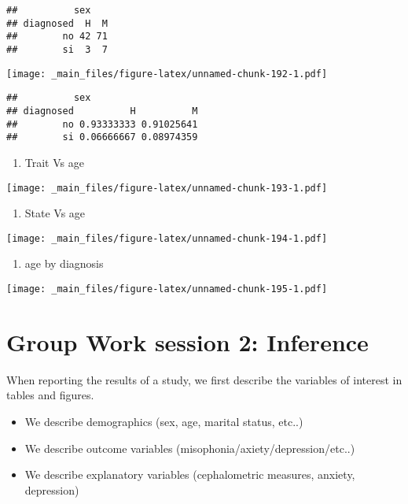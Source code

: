 \documentclass[
]{book}
\providecommand{\tightlist}{%
  \setlength{\itemsep}{0pt}\setlength{\parskip}{0pt}}
\begin{document}
\begin{verbatim}
##          sex
## diagnosed  H  M
##        no 42 71
##        si  3  7
\end{verbatim}

\texttt{[image: \_main\_files/figure-latex/unnamed-chunk-192-1.pdf]}

\begin{verbatim}
##          sex
## diagnosed          H          M
##        no 0.93333333 0.91025641
##        si 0.06666667 0.08974359
\end{verbatim}

\begin{enumerate}
\def\labelenumi{\alph{enumi}.}
\setcounter{enumi}{7}
\tightlist
\item
  Trait Vs age
\end{enumerate}

\texttt{[image: \_main\_files/figure-latex/unnamed-chunk-193-1.pdf]}

\begin{enumerate}
\def\labelenumi{\roman{enumi}.}
\tightlist
\item
  State Vs age
\end{enumerate}

\texttt{[image: \_main\_files/figure-latex/unnamed-chunk-194-1.pdf]}

\begin{enumerate}
\def\labelenumi{\alph{enumi}.}
\setcounter{enumi}{9}
\tightlist
\item
  age by diagnosis
\end{enumerate}

\texttt{[image: \_main\_files/figure-latex/unnamed-chunk-195-1.pdf]}

\hypertarget{group-work-session-2-inference}{%
\section{Group Work session 2: Inference}\label{group-work-session-2-inference}}

When reporting the results of a study, we first describe the variables of interest in tables and figures.

\begin{itemize}
\tightlist
\item
  We describe demographics (sex, age, marital status, etc..)
\item
  We describe outcome variables (misophonia/axiety/depression/etc..)
\item
  We describe explanatory variables (cephalometric measures, anxiety, depression)
\end{itemize}
\end{document}
